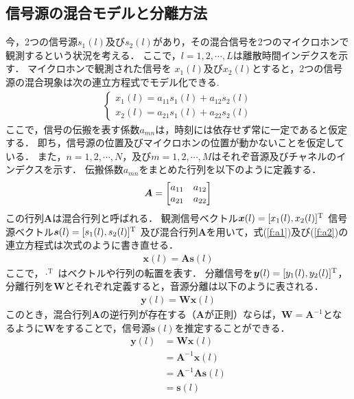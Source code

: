 \subsection{信号源の混合モデルと分離方法}
今，2つの信号源$s_1(l)$及び$s_2(l)$があり，その混合信号を2つのマイクロホンで観測するという状況を考える．
ここで，$l = 1, 2, \cdots , L$は離散時間インデクスを示す．
マイクロホンで観測された信号を
$x_1(l)$及び$x_2(l)$とすると，2つの信号源の混合現象は次の連立方程式でモデル化できる.
\begin{eqnarray}
  \begin{cases}
    x_1(l) = a_{11}s_1(l) + a_{12}s_2(l)  \label{f:a1}\\
    x_2(l) = a_{21}s_1(l) + a_{22}s_2(l)  \label{f:a2}
  \end{cases}
\end{eqnarray}
ここで，信号の伝搬を表す係数$a_{mn}$は，時刻には依存せず常に一定であると仮定する．
即ち，信号源の位置及びマイクロホンの位置が動かないことを仮定している．
また，$n = 1, 2, \cdots , N$，及び$m =
1, 2, \cdots , M $はそれぞ音源及びチャネルのインデクスを示す．
伝搬係数$a_{mn}$をまとめた行列を以下のように定義する．
\begin{align}
    \bm{A} = \textcolor{black}{\begin{bmatrix}
    a_{11}  & a_{12}  \\
    a_{21}  & a_{22}  \\
    \end{bmatrix}}
\end{align}
この行列$\bm{A}$は混合行列と呼ばれる．
観測信号ベクトル$\bm{x}(l) = \textcolor{black}{[x_1(l),x_2(l)]^\mathrm{T}}$
信号源ベクトル$\bm{s}(l) = \textcolor{black}{[s_1(l),s_2(l)]^\mathrm{T}}$
及び混合行列$\bm{A}$を用いて，式(\ref{f:a1})及び(\ref{f:a2})の連立方程式は次式のように書き直せる．
\begin{align}
    \bm{x}(l) = \bm{A}\bm{s}(l) \label{f:x}
\end{align}
ここで，$\cdot^\mathrm{T}$ はベクトルや行列の転置を表す．
分離信号を$\bm{y}(l) = \textcolor{black}{[y_1(l),y_2(l)]^\mathrm{T}}$，分離行列を$\bm{W}$とそれぞれ定義すると，音源分離は以下のように表される．
\begin{align}
    \bm{y}(l) = \bm{W}\bm{x}(l)
\end{align}
このとき，混合行列$\bm{A}$の逆行列が存在する（$\bm{A}$が正則）ならば，$\bm{W}=\bm{A}^{-1}$となるように$\bm{W}$をすることで，信号源$\bm{s}(l)$を推定することができる．
\begin{align}
    \bm{y}(l) &= \bm{W}\bm{x}(l)\\
    &= \bm{A}^{-1}\bm{x}(l)\\
    &= \bm{A}^{-1}\bm{A}\bm{s}(l)\\
    &= \bm{s}(l)
\end{align}

